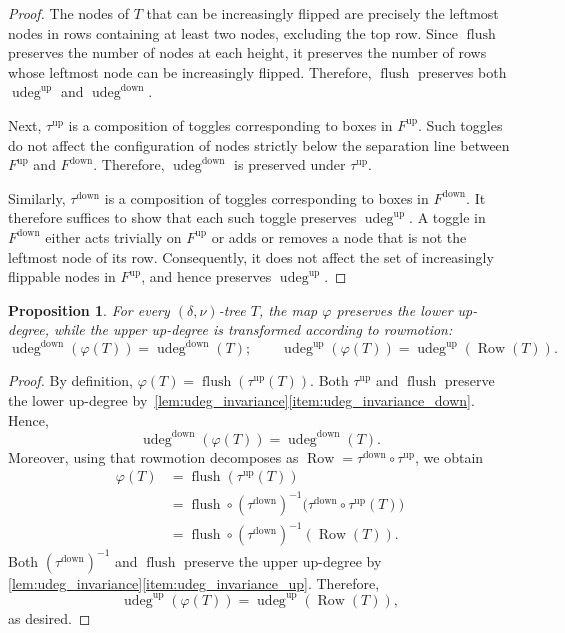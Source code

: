 \documentclass[11pt]{amsart}
\newcounter{height}
\newcommand{\up}{^{\operatorname{up}}}
\newcommand{\down}{^{\operatorname{down}}}
\DeclareMathOperator{\row}{Row}
\DeclareMathOperator{\flush}{flush}
\DeclareMathOperator{\udeg}{udeg}
\newtheorem{proposition}[theorem]{Proposition}
\theoremstyle{definition}
\begin{document}
\begin{proof}
The nodes of $T$ that can be increasingly flipped are precisely the leftmost nodes in rows containing at least two nodes, excluding the top row. Since $\flush$ preserves the number of nodes at each height, it preserves the number of rows whose leftmost node can be increasingly flipped. Therefore, $\flush$ preserves both $\udeg\up$ and $\udeg\down$.

Next, $\tau\up$ is a composition of toggles corresponding to boxes in $F\up$. Such toggles do not affect the configuration of nodes strictly below the separation line between $F\up$ and $F\down$. Therefore, $\udeg\down$ is preserved under $\tau\up$.

Similarly, $\tau\down$ is a composition of toggles corresponding to boxes in $F\down$. It therefore suffices to show that each such toggle preserves $\udeg\up$. A toggle in $F\down$ either acts trivially on $F\up$ or adds or removes a node that is not the leftmost node of its row. Consequently, it does not affect the set of increasingly flippable nodes in $F\up$, and hence preserves $\udeg\up$.
\end{proof}

\begin{proposition} \label{prop:udeg_split}
For every $(\delta,\nu)$-tree $T$, the map $\varphi$ preserves the lower up-degree, while the upper up-degree is transformed according to rowmotion:
\[\udeg\down(\varphi(T)) = \udeg\down(T); \qquad \udeg\up(\varphi(T)) = \udeg\up(\row(T)).\]
\end{proposition}

\begin{proof}
By definition, $\varphi(T) = \flush(\tau\up(T))$. Both $\tau\up$ and $\flush$ preserve the lower up-degree by~\cref{lem:udeg_invariance}\eqref{item:udeg_invariance_down}. Hence,
\[\udeg\down(\varphi(T)) = \udeg\down(T).\]
Moreover, using that rowmotion decomposes as $\row = \tau\down \circ \tau\up$, we obtain
\begin{align*}
\varphi(T) &= \flush(\tau\up(T)) \\
&= \flush \circ (\tau\down)^{-1} \bigl(\tau\down \circ \tau\up(T)\bigr) \\
&= \flush \circ (\tau\down)^{-1}(\row(T)).
\end{align*}
Both $(\tau\down)^{-1}$ and $\flush$ preserve the upper up-degree by \cref{lem:udeg_invariance}\eqref{item:udeg_invariance_up}. Therefore,
\[\udeg\up(\varphi(T)) = \udeg\up(\row(T)),\]
as desired.
\end{proof}
\end{document}
